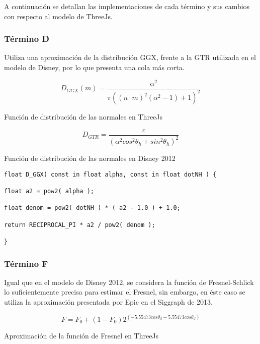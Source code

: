 A continuaci\'on se detallan las implementaciones de cada t\'ermino y sus cambios con respecto al modelo de ThreeJs.

  \subsubsection{T\'ermino D}
  Utiliza una aproximaci\'on de la distribuci\'on GGX, frente a la GTR utilizada en el modelo de Disney, por lo que
  presenta una cola m\'as corta.\\

  \begin{eqfloat}
    \begin{equation}
      D_{GGX}(m) = \frac{\alpha^2}{\pi((n\cdotp{m})^2(\alpha^2 - 1 ) + 1)^2}
    \end{equation}
  \caption{Funci\'on de distribuci\'on de las normales en ThreeJs}
  \end{eqfloat}
  \singlespacing

  \begin{eqfloat}
    \begin{equation}
      D_{GTR} = \frac
      {c}
      {(\alpha^2 cos^2 \theta_h + sin^2 \theta_h)^2}
    \end{equation}
  \caption{Funci\'on de distribuci\'on de las normales en Disney 2012}
  \end{eqfloat}
  \singlespacing

  \begin{lstlisting}[caption=Implementaci\'on en ThreeJs del t\'ermino de geometr\'ia]
float D_GGX( const in float alpha, const in float dotNH ) {

float a2 = pow2( alpha );

float denom = pow2( dotNH ) * ( a2 - 1.0 ) + 1.0; 

return RECIPROCAL_PI * a2 / pow2( denom );

}
  \end{lstlisting}
  \singlespacing

  \subsubsection{T\'ermino F}
  Igual que en el modelo de Disney 2012, se considera la funci\'on de Fresnel-Schlick lo suficientemente precisa para
  estimar el Fresnel, sin embargo, en \'este caso se utiliza la aproximaci\'on presentada por Epic en el Siggraph de 2013.\\

  \begin{eqfloat}
    \begin{equation}
      F= F_0 + (1 - F_0)2^{(-5.55473cos\theta_d - 5.55473cos\theta_d)}
    \end{equation}
  \caption{Aproximaci\'on de la funci\'on de Fresnel en ThreeJs}
  \end{eqfloat}

